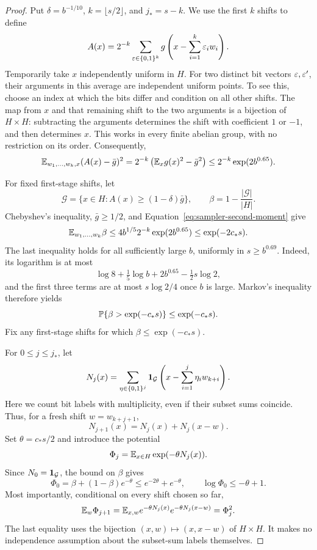 \begin{proof}
Put $\delta=b^{-1/10}$, $k=\lfloor s/2\rfloor$, and $j_*=s-k$.
We use the first $k$ shifts to define
\[
 A(x)=2^{-k}\sum_{\varepsilon\in\{0,1\}^k}
       g\left(x-\sum_{i=1}^k\varepsilon_iw_i\right).
\]
Temporarily take $x$ independently uniform in $H$. For two distinct bit
vectors $\varepsilon,\varepsilon'$, their arguments in this average are independent
uniform points. To see this, choose an index at which the bits differ and
condition on all other shifts. The map from $x$ and that remaining shift
to the two arguments is a bijection of $H\times H$: subtracting the
arguments determines the shift with coefficient $1$ or $-1$, and then
determines $x$. This works in every finite abelian group, with no
restriction on its order. Consequently,
\begin{equation}
\label{eq:sampler-second-moment}
 \mathbb E_{w_1,\ldots,w_k,x}(A(x)-\bar g)^2
 =2^{-k}\left(\mathbb E_xg(x)^2-\bar g^2\right)
 \le 2^{-k}\exp(2b^{0.65}).
\end{equation}

For fixed first-stage shifts, let
\[
 \mathcal G=\{x\in H:A(x)\ge(1-\delta)\bar g\},
 \qquad \beta=1-\frac{|\mathcal G|}{|H|}.
\]
Chebyshev's inequality, $\bar g\ge1/2$, and
Equation~\eqref{eq:sampler-second-moment} give
\[
 \mathbb E_{w_1,\ldots,w_k}\beta
 \le 4b^{1/5}2^{-k}\exp(2b^{0.65})
 \le \exp(-2c_*s).
\]
The last inequality holds for all sufficiently large $b$, uniformly in
$s\ge b^{0.69}$. Indeed, its logarithm is at most
\[
 \log 8+\tfrac15\log b+2b^{0.65}-\tfrac12s\log 2,
\]
and the first three terms are at most $s\log 2/4$ once $b$ is large.
Markov's inequality therefore yields
\begin{equation}
\label{eq:sampler-small-bad-set}
 \mathbb P\{\beta>\exp(-c_*s)\}\le\exp(-c_*s).
\end{equation}
Fix any first-stage shifts for which
$\beta\le\exp(-c_*s)$.

For $0\le j\le j_*$, let
\[
 N_j(x)=
 \sum_{\eta\in\{0,1\}^j}
 \mathbf 1_{\mathcal G}\left(x-\sum_{i=1}^j\eta_iw_{k+i}\right).
\]
Here we count bit labels with multiplicity, even if their subset sums
coincide. Thus, for a fresh shift $w=w_{k+j+1}$,
\[
 N_{j+1}(x)=N_j(x)+N_j(x-w).
\]
Set $\theta=c_*s/2$ and introduce the potential
\[
 \Phi_j=\mathbb E_{x\in H}\exp(-\theta N_j(x)).
\]
Since $N_0=\mathbf 1_{\mathcal G}$, the bound on $\beta$ gives
\[
 \Phi_0=\beta+(1-\beta)e^{-\theta}
 \le e^{-2\theta}+e^{-\theta},
 \qquad \log\Phi_0\le-\theta+1.
\]
Most importantly, conditional on every shift chosen so far,
\begin{equation}
\label{eq:sampler-potential-square}
 \mathbb E_w\Phi_{j+1}
 =\mathbb E_{x,w}e^{-\theta N_j(x)}e^{-\theta N_j(x-w)}
 =\Phi_j^2.
\end{equation}
The last equality uses the bijection $(x,w)\mapsto(x,x-w)$ of
$H\times H$. It makes no independence assumption about the subset-sum
labels themselves.


\end{proof}
